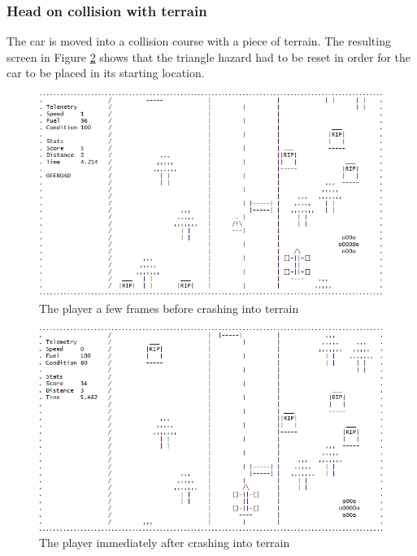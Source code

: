 \documentclass{article}
\begin{document}
\subsubsection*{Head on collision with terrain}
The car is moved into a collision course with a piece of terrain. The resulting screen in Figure \ref{fig:collision_test_headon_terrain2} shows that the triangle hazard had to be reset in order for the car to be placed in its starting location.
\begin{figure}[!ht]
	\begin{center}
	\includegraphics[width=0.63\paperwidth]{images/collision_test_headon_terrain}
	\caption{The player a few frames before crashing into terrain}
	\label{fig:collision_test_headon_terrain} 
	\end{center}
\end{figure}
\begin{figure}[!ht]
	\begin{center}
	\includegraphics[width=0.63\paperwidth]{images/collision_test_headon_terrain2}
	\caption{The player immediately after crashing into terrain}
	\label{fig:collision_test_headon_terrain2} 
	\end{center}
\end{figure}
\newpage
\end{document}
